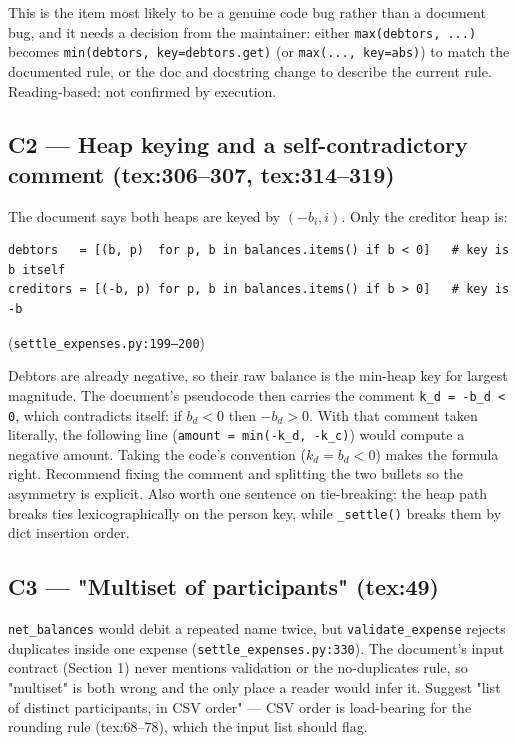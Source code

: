 \documentclass[11pt]{article}
\begin{document}
This is the item most likely to be a genuine code bug rather than a document bug, and it needs a
decision from the maintainer: either \texttt{max(debtors, ...)} becomes
\texttt{min(debtors, key=debtors.get)} (or \texttt{max(..., key=abs)}) to match the documented rule, or
the doc and docstring change to describe the current rule. Reading-based: not confirmed by execution.

\subsection{C2 --- Heap keying and a self-contradictory comment (tex:306--307, tex:314--319)}

The document says both heaps are keyed by $(-b_i, i)$. Only the creditor heap is:

\begin{verbatim}
debtors   = [(b, p)  for p, b in balances.items() if b < 0]   # key is b itself
creditors = [(-b, p) for p, b in balances.items() if b > 0]   # key is -b
\end{verbatim}
(\texttt{settle\_expenses.py:199--200})

Debtors are already negative, so their raw balance is the min-heap key for largest magnitude. The document's
pseudocode then carries the comment \texttt{k\_d = -b\_d < 0}, which contradicts itself: if $b_d < 0$ then
$-b_d > 0$. With that comment taken literally, the following line
(\texttt{amount = min(-k\_d, -k\_c)}) would compute a negative amount. Taking the code's convention
($k_d = b_d < 0$) makes the formula right. Recommend fixing the comment and splitting the two bullets
so the asymmetry is explicit. Also worth one sentence on tie-breaking: the heap path breaks ties
lexicographically on the person key, while \texttt{\_settle()} breaks them by dict insertion order.

\subsection{C3 --- "Multiset of participants" (tex:49)}

\texttt{net\_balances} would debit a repeated name twice, but \texttt{validate\_expense} rejects
duplicates inside one expense (\texttt{settle\_expenses.py:330}). The document's input contract (Section 1)
never mentions validation or the no-duplicates rule, so "multiset" is both wrong and the only place a
reader would infer it. Suggest "list of distinct participants, in CSV order" --- CSV order is load-bearing
for the rounding rule (tex:68--78), which the input list should flag.
\end{document}
